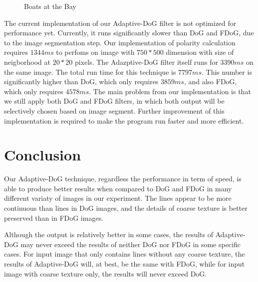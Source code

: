 \begin{figure}[H]
	\centering
	\caption{Boats at the Bay}\label{fig:Compare4}
\end{figure}
The current implementation of our Adaptive-DoG filter is not optimized for performance yet. Currently, it runs significantly slower than DoG and FDoG, due to the image segmentation step. Our implementation of polarity calculation requires $1344 ms$ to perfoms on image with $750*500$ dimension with size of neigborhood at $20*20$ pixels. The Adazptive-DoG filter itself runs for $3390 ms$ on the same image. The total run time for this technique is $7797 ms$. This number is significantly higher than DoG, which only requires $3859 ms$, and also FDoG, which only requires $4578 ms$. The main problem from our implementation is that we still apply both DoG and FDoG filters, in which both output will be selectively chosen based on image segment. Further improvement of this implementation is required to make the program run faster and more efficient.

\section{Conclusion}
Our Adaptive-DoG technique, regardless the performance in term of speed, is able to produce better results when compared to DoG and FDoG in many different variaty of images in our experiment. The lines appear to be more continuous than lines in DoG images, and the details of coarse texture is better preserved than in FDoG images.

Although the output is relatively better in some cases, the results of Adaptive-DoG may never exceed the results of neither DoG nor FDoG in some specific cases. For input image that only contains lines without any coarse texture, the results of Adaptive-DoG will, at best, be the same with FDoG, while for input image with coarse texture only, the results will never exceed DoG.


